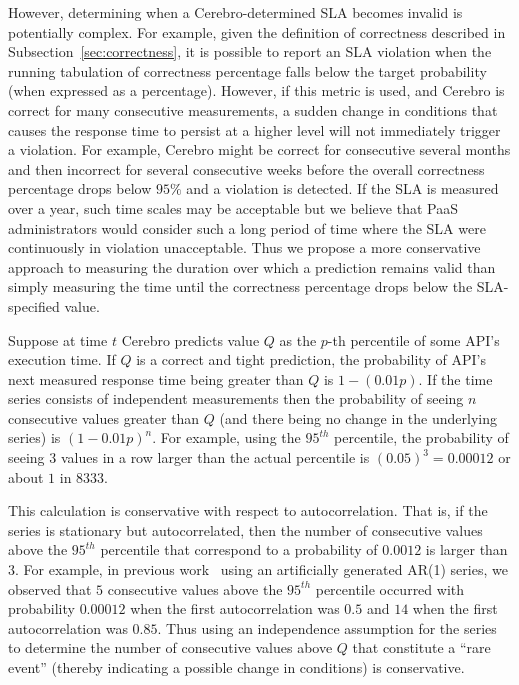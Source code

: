 However, determining when a Cerebro-determined SLA becomes invalid is
potentially complex. For example, given the definition of correctness
described in Subsection~\ref{sec:correctness}, it is possible to report an SLA violation
when the running tabulation of correctness percentage falls below the target
probability (when expressed as a percentage).  However, if this metric is
used, and Cerebro is correct for many consecutive measurements, a sudden
change in conditions that causes the response time to persist at a higher
level will not immediately trigger a violation.  For example, Cerebro might be
correct for consecutive several months and then incorrect for several
consecutive weeks before the overall correctness percentage drops below $95\%$
and a violation is detected.  If the SLA is measured over a year, such time
scales may be acceptable but we believe that PaaS administrators would
consider such a long period of time where the SLA were continuously in
violation unacceptable.
Thus we propose a more conservative approach to measuring the duration over
which a prediction remains valid than simply measuring the time until the
correctness percentage drops below the SLA-specified value.

Suppose at time $t$ Cerebro predicts value $Q$ as the $p$-th percentile of
some API's execution time.  If $Q$ is a correct and tight prediction,
the probability of API's next measured response time being greater than 
$Q$ is $1-(0.01p)$.  If the time series consists of independent
measurements then the probability of seeing $n$ consecutive values greater
than $Q$ (and there being no change in the underlying series) is $(1-0.01p)^n$. 
For example, using the $95^{th}$ percentile, the probability of seeing $3$
values in a row larger than the actual percentile is $(0.05)^3 = 0.00012$
or about $1$ in $8333$.

This calculation is conservative with respect to autocorrelation. That is, if
the series is stationary but autocorrelated, then the number of consecutive 
values above the $95^{th}$ percentile that correspond to a probability of
$0.0012$ is larger than $3$.  For example, in previous
work~\cite{Nurmi:2007:QQB:1791551.1791556} 
using an artificially generated AR(1) series, 
we observed that $5$ consecutive values above the $95^{th}$ percentile
occurred with probability $0.00012$ when the first autocorrelation was $0.5$
and $14$ when the first autocorrelation was $0.85$.  Thus using an independence
assumption for the series to determine the number of consecutive values above
$Q$ that constitute a ``rare event'' (thereby indicating a possible change in
conditions) is conservative.

